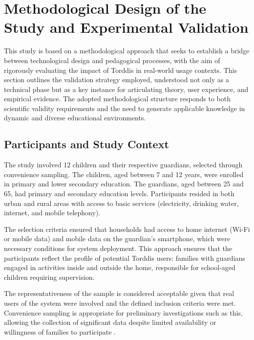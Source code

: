                 \section{Methodological Design of the Study and Experimental Validation}
                \label{section:fifth}
                This study is based on a methodological approach that seeks to establish a bridge between technological design and pedagogical processes, with the aim of rigorously evaluating the impact of Torddis in real-world usage contexts. This section outlines the validation strategy employed, understood not only as a technical phase but as a key instance for articulating theory, user experience, and empirical evidence. The adopted methodological structure responds to both scientific validity requirements and the need to generate applicable knowledge in dynamic and diverse educational environments.
                
                \subsection{Participants and Study Context}
                The study involved 12 children and their respective guardians, selected through convenience sampling. The children, aged between 7 and 12 years, were enrolled in primary and lower secondary education. The guardians, aged between 25 and 65, had primary and secondary education levels. Participants resided in both urban and rural areas with access to basic services (electricity, drinking water, internet, and mobile telephony).
                
                The selection criteria ensured that households had access to home internet (Wi-Fi or mobile data) and mobile data on the guardian’s smartphone, which were necessary conditions for system deployment. This approach ensures that the participants reflect the profile of potential Torddis users: families with guardians engaged in activities inside and outside the home, responsible for school-aged children requiring supervision.
                
                The representativeness of the sample is considered acceptable given that real users of the system were involved and the defined inclusion criteria were met. Convenience sampling is appropriate for preliminary investigations such as this, allowing the collection of significant data despite limited availability or willingness of families to participate \citep{DiPietro2025Meta}.
                

